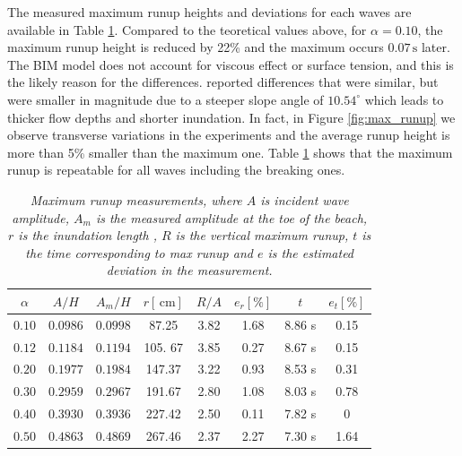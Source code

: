 \documentclass[review, authoryear]{elsarticle}
\newcommand{\s}{\,\mbox{s}}
\newcommand{\cm}{\,\mbox{cm}}
\begin{document}
The measured maximum runup heights and deviations for each waves are available in Table \ref{tab:max_shore}. Compared to the teoretical values above, for $\alpha=0.10$,  the maximum runup height is reduced by 22\% and the maximum occurs $0.07\s$ later.  The BIM model does not account for viscous effect or surface tension, and this is the likely reason for the differences. \cite{pedersen2013runup} reported differences that were similar, but were smaller in magnitude due to a steeper 
slope angle of $10.54 ^\circ$ which leads to thicker flow depths and shorter inundation. In fact, in Figure \ref{fig:max_runup} we observe transverse variations in the experiments and the average
runup height is more than 5\% smaller than the maximum one. Table \ref{tab:max_shore} shows that the maximum runup is repeatable for all waves including the breaking ones. %

\begin{table}[]
\caption{\textit{Maximum runup measurements, where $A$ is incident wave amplitude, $A_m$ is the measured amplitude at the toe of the beach, $r$ is the inundation length , $R$ is the vertical maximum runup, $t$ is the time corresponding to max runup and $e$ is the estimated deviation in the measurement.}}
\centering
\begin{tabular}{cccccccc}
\hline
      $\alpha$&  $A/H$&   $A_m/H$&  $r [\cm]$ &$R/A$ & $e_r [\%]$ & $t$ & $e_t [\%]$ \\ \hline
\textit{$0.10$} &\textit{$0.0986$}  &\textit{$0.0998$}  & 87.25    &    3.82  & 1.68             & 8.86 s        & 0.15              \\
\textit{$0.12$}  &\textit{$0.1184$}  &\textit{$0.1194$}  & 105. 67   &    3.85   & 0.27             & 8.67 s        & 0.15               \\
\textit{$0.20$}  &\textit{$0.1977$}  &\textit{$0.1984$} & 147.37    &    3.22  & 0.93            & 8.53 s        & 0.31                \\
\textit{$0.30$}  &\textit{$0.2959$}  &\textit{$0.2967$}  & 191.67     &   2.80  & 1.08           & 8.03 s        & 0.78              \\
\textit{$0.40$}  &\textit{$0.3930$}  &\textit{$0.3936$}  & 227.42      &   2.50 & 0.11            & 7.82 s        & 0              \\
\textit{$0.50$}  &\textit{$0.4863$}  &\textit{$0.4869$}  & 267.46       &    2.37 & 2.27            & 7.30 s        & 1.64              
\end{tabular}
\label{tab:max_shore}
\end{table}
\end{document}
